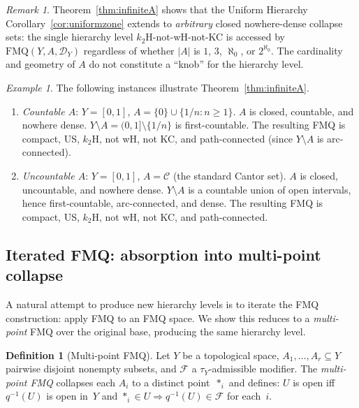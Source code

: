 \documentclass[11pt]{article}
\theoremstyle{definition}
\newtheorem{definition}[theorem]{Definition}
\theoremstyle{remark}
\newtheorem{remark}[theorem]{Remark}
\newtheorem{example}[theorem]{Example}
\begin{document}
\begin{remark}\label{rem:infiniteA-significance}
Theorem~\ref{thm:infiniteA} shows that the Uniform Hierarchy
Corollary~\ref{cor:uniformzone} extends to
\emph{arbitrary} closed nowhere-dense collapse sets:
the single hierarchy level $k_2$H-not-wH-not-KC is
accessed by $\mathrm{FMQ}(Y, A, \mathcal{D}_Y)$ regardless
of whether $|A|$ is $1$, $3$, $\aleph_0$, or $2^{\aleph_0}$.
The cardinality and geometry of $A$ do not constitute a ``knob''
for the hierarchy level.
\end{remark}

\begin{example}\label{ex:infiniteA}
The following instances illustrate Theorem~\ref{thm:infiniteA}.
\begin{enumerate}[nosep]
\item \emph{Countable $A$}: $Y = [0,1]$,
  $A = \{0\} \cup \{1/n : n \geq 1\}$.
  $A$ is closed, countable, and nowhere dense.
  $Y \setminus A = (0,1] \setminus \{1/n\}$ is first-countable.
  The resulting FMQ is compact, US, $k_2$H, not wH, not KC, and
  path-connected (since $Y \setminus A$ is arc-connected).
\item \emph{Uncountable $A$}: $Y = [0,1]$, $A = \mathcal{C}$
  (the standard Cantor set).
  $A$ is closed, uncountable, and nowhere dense.
  $Y \setminus A$ is a countable union of open intervals, hence
  first-countable, arc-connected, and dense.
  The resulting FMQ is compact, US, $k_2$H, not wH, not KC,
  and path-connected.
\end{enumerate}
\end{example}

\subsection{Iterated FMQ: absorption into multi-point collapse}\label{subsec:iterated}

A natural attempt to produce new hierarchy levels is to iterate
the FMQ construction: apply FMQ to an FMQ space.
We show this reduces to a \emph{multi-point} FMQ over the
original base, producing the same hierarchy level.

\begin{definition}[Multi-point FMQ]\label{def:multipointfmq}
Let $Y$ be a topological space, $A_1, \ldots, A_r \subseteq Y$
pairwise disjoint nonempty subsets, and $\mathcal{F}$ a
$\tau_Y$-admissible modifier.
The \emph{multi-point FMQ} collapses each $A_i$ to a distinct
point~$\ast_i$ and defines: $U$ is open iff $q^{-1}(U)$ is open
in~$Y$ and $\ast_i \in U \Rightarrow q^{-1}(U) \in \mathcal{F}$
for each~$i$.
\end{definition}
\end{document}
